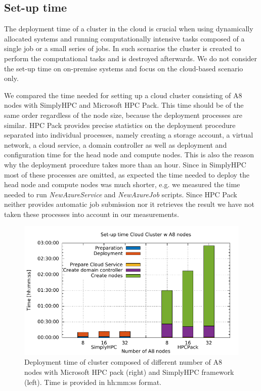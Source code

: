 \documentclass[3p,times]{elsarticle}
\begin{document}
\subsection{Set-up time}
The deployment time of a cluster in the cloud is crucial when using dynamically allocated systems and running computationally intensive tasks composed of a single job or a small series of jobs. In such scenarios the cluster is created to perform the computational tasks and is destroyed afterwards. We do not consider the set-up time on on-premise systems and focus on the cloud-based scenario only. 

We compared the time needed for setting up a cloud cluster consisting of A8 nodes with SimplyHPC and Microsoft HPC Pack. This time should be of the same order regardless of the node size, because the deployment processes are similar. HPC Pack provides precise statistics on the deployment procedure separated into individual processes, namely creating a storage account, a virtual network, a cloud service, a domain controller as well as deployment and configuration time for the head node and compute nodes. This is also the reason why the deployment procedure takes more than an hour. Since in SimplyHPC most of these processes are omitted, as expected the time needed to deploy the head node and compute nodes was much shorter, e.g. we measured the time needed to run \textit{NewAzureService} and \textit{NewAzureJob} scripts. Since HPC Pack neither provides automatic job submission nor it retrieves the result we have not taken these processes into account in our measurements. 

\begin{figure}[h]
\centering
	\includegraphics[width=.6\linewidth]{gplt-creation-simplyvshpc}
	\caption{Deployment time of cluster composed of different number of A8 nodes with Microsoft HPC pack (right) and SimplyHPC framework (left). Time is provided in hh:mm:ss format.}
	\label{fig:deployTime}
\end{figure}
\end{document}
